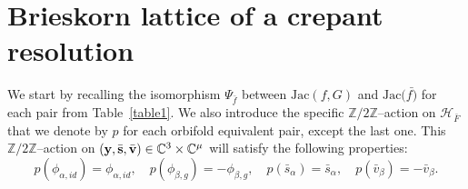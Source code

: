 \documentclass[reqno,12pt]{amsart}
\numberwithin{equation}{section}
\theoremstyle{plain}
\newtheorem{theorem}{Theorem}
\theoremstyle{definition}
\newcommand{\CC}{{\mathbb{C}}}
\newcommand{\ZZ}{{\mathbb{Z}}}
\newcommand{\epi}{{\bf e}}
\newcommand{\Jac}{\mathrm{Jac}}
\newcommand{\id}{\mathrm{id}}
\newcommand{\bs}{{\bf s}}
\newcommand{\bv}{{\bf v}}
\newcommand{\by}{{\bf y}}
\newcommand{\age}{\mathrm{age}}
\def\H{{\mathcal H}}
\def\T{{\mathcal T}}
\numberwithin{equation}{section}
\begin{document}
%     
% 


\section{Brieskorn lattice of a crepant resolution}\label{section: proof-1}

We start by recalling the isomorphism $\Psi_{\bar f}$ between $\Jac(f,G)$ and $\Jac(\bar{f)}$ for each pair from Table~\ref{table1}.
We also introduce the specific $\ZZ/2\ZZ$--action on $\H_{\bar F}$ that we denote by $p$ for each orbifold equivalent pair, except the last one.
This $\ZZ/2\ZZ$--action on $(\by, \bar{\bs}, \bar{\bv}) \in \CC^3 \times \CC^{\mu}$ will satisfy the following properties:
\[
p(\phi_{\alpha, id}) = \phi_{\alpha, id}, \quad p(\phi_{\beta, g}) = -\phi_{\beta, g}, \quad p(\bar{s}_\alpha) = \bar{s}_\alpha, \quad p(\bar{v}_\beta) = - \bar{v}_\beta.
\]
\end{document}
